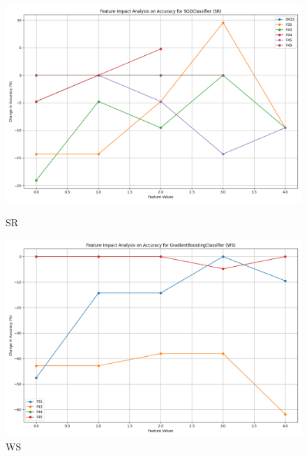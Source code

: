 \begin{figure}[H]
    \centering
    \begin{minipage}{0.495\textwidth}
        \centering
        \includegraphics[width=\linewidth]{analysis/images/feature_impact_accuracy_SR_SGDClassifier.png}
        \caption{SR}
        \label{fig:sr_accuracy_analysis}
    \end{minipage}\hfill
    \begin{minipage}{0.495\textwidth}
        \centering
        \includegraphics[width=\linewidth]{analysis/images/feature_impact_accuracy_WS_GradientBoostingClassifier.png}
        \caption{WS}
        \label{fig:ws_accuracy_analysis}
    \end{minipage}
\end{figure}

